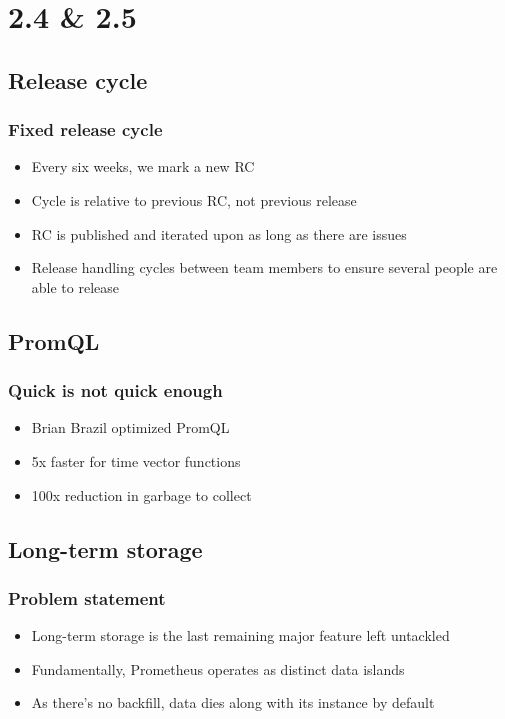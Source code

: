 \documentclass[t]{beamer}
\begin{document}
\section{2.4 \& 2.5}


\subsection{Release cycle}

\begin{frame}
	\frametitle{Fixed release cycle}
	\begin{itemize}
		\item Every six weeks, we mark a new RC
		\item Cycle is relative to previous RC, not previous release
		\item RC is published and iterated upon as long as there are issues
		\item Release handling cycles between team members to ensure several people are able to release
	\end{itemize}
\end{frame}


\subsection{PromQL}

\begin{frame}
	\frametitle{Quick is not quick enough}
	\begin{itemize}
		\item Brian Brazil optimized PromQL
		\item 5x faster for time vector functions
		\item 100x reduction in garbage to collect
	\end{itemize}
\end{frame}


\subsection{Long-term storage}

\begin{frame}
	\frametitle{Problem statement}
	\begin{itemize}
		\item Long-term storage is the last remaining major feature left untackled
		\item Fundamentally, Prometheus operates as distinct data islands
		\item As there's no backfill, data dies along with its instance by default
	\end{itemize}
\end{frame}
\end{document}
